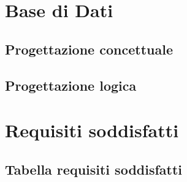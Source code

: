 \documentclass[12pt]{article}
\begin{document}
\section{Base di Dati}
\subsection{Progettazione concettuale}
\subsection{Progettazione logica}
\section{Requisiti soddisfatti}
\subsection{Tabella requisiti soddisfatti}
\end{document}
